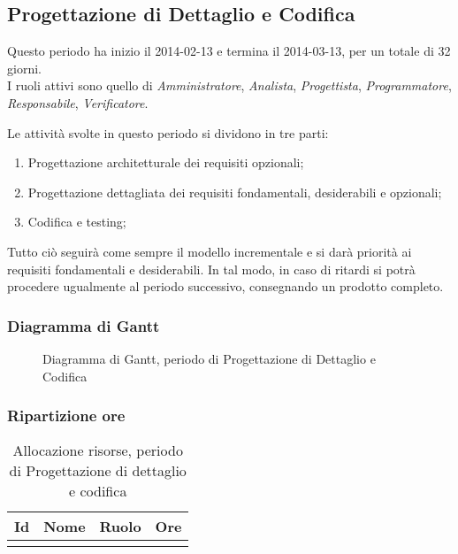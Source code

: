 	\subsection{Progettazione di Dettaglio e Codifica}
	 
Questo periodo ha inizio il 2014-02-13 e termina il 2014-03-13, per un totale di 32 giorni. \\
I ruoli attivi sono quello di \textit{Amministratore}, \textit{Analista}, \textit{Progettista}, \textit{Programmatore}, \textit{Responsabile}, \textit{Verificatore}.

Le attività svolte in questo periodo si dividono in tre parti:

\begin{enumerate}

	\item Progettazione architetturale dei requisiti opzionali;
	\item Progettazione dettagliata dei requisiti fondamentali, desiderabili e opzionali;
	\item Codifica e testing;

\end{enumerate}

Tutto ciò seguirà come sempre il modello incrementale e si darà priorità ai requisiti fondamentali e desiderabili.
In tal modo, in caso di ritardi si potrà procedere ugualmente al periodo successivo, consegnando un prodotto completo.

\subsubsection{Diagramma di Gantt}

\begin{figure}[H]
\centering
\scalebox{0.63}{%

	

}
\caption{Diagramma di Gantt, periodo di Progettazione di Dettaglio e Codifica}
\end{figure}

\subsubsection{Ripartizione ore}

\begin{center}
\begin{longtable}{ l l l c  }
	\hline
	\multicolumn{1}{c}{\textbf{Id}} & 
	\multicolumn{1}{c}{\textbf{Nome}} & 
	\multicolumn{1}{c}{\textbf{Ruolo}}& 
	\multicolumn{1}{c}{\textbf{Ore}} \\
	\hline
	
		
	
	\caption{Allocazione risorse, periodo di Progettazione di dettaglio e codifica}
\end{longtable}	
\end{center}
	
